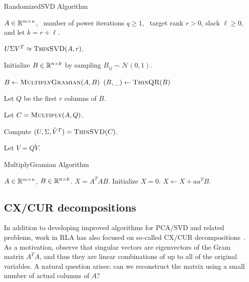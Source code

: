 \begin{algorithm}[tb]
 \caption{{\sc RandomizedSVD} Algorithm}
  \label{alg:rsvd}
  \begin{algorithmic}[1]
    \Require $A \in \mathbb{R}^{m\times n}$, \
      number of power iterations $q \ge 1$, \
      target rank $r > 0$, slack $\ell \ge 0$, and let $k=r+\ell$.

    \Ensure $U \Sigma V^T \approx \Call{ThinSVD}{A, r}$.

    \State Initialize $B \in \mathbb{R}^{n\times k}$ by sampling $B_{ij} \sim \mathcal{N}(0, 1)$.

    \For{$q$ times}
        \State $B \gets \Call{MultiplyGramian}{A, B}$
        \State $(B, \_) \gets \Call{ThinQR}{B}$
    \EndFor

    \State Let $Q$ be the first $r$ columns of $B$.

    \State Let $C = \Call{Multiply}{A, Q}$.

    \State Compute $(U, \Sigma, \tilde V^T) = \Call{ThinSVD}{C}$.

    \State Let $V = Q \tilde V$.

    \end{algorithmic}
\end{algorithm}

\begin{algorithm}[tb]
  \caption{{\sc MultiplyGramian} Algorithm}
  \label{alg:gram}
  \begin{algorithmic}[1]
    \Require $A \in \mathbb{R}^{m\times n}$, $B \in \mathbb{R}^{n\times k}$.
    \Ensure $X = A^T A B$.
    \State Initialize $X = 0$.
        \State $X \gets X + a a^T B$.
    \EndFor
  \end{algorithmic}
\end{algorithm}


\subsection{CX/CUR decompositions}

In addition to developing improved algorithms for PCA/SVD and related problems,
work in RLA has also focused on so-called CX/CUR
decompositions~\cite{DMM08,CUR_PNAS}.  As a motivation, observe that singular
vectors are eigenvectors of the Gram matrix $A^TA$, and thus they are linear
combinations of up to all of the original variables.  A natural question
arises: can we reconstruct the matrix using a small number of actual columns of
$A$?

